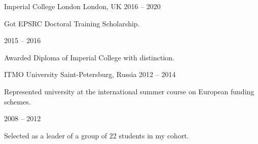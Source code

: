 

\begin{cventries}
            {Imperial College London} %
            {London, UK} %
            {2016 -- 2020} %
            {
                \begin{cvitems} %
                    \item {Got EPSRC Doctoral Training Scholarship.}
                \end{cvitems}
            }

            {} %
            {} %
            {2015 -- 2016} %
            {
                \begin{cvitems} %
                    \item {Awarded Diploma of Imperial College with distinction.}
                \end{cvitems}
            }

            {ITMO University} %
            {Saint-Petersburg, Russia} %
            {2012 -- 2014} %
            {
                \begin{cvitems} %
                    \item {Represented university at the international summer course on European funding schemes.}
                \end{cvitems}
            }

            {} %
            {} %
            {2008 -- 2012} %
            {
                \begin{cvitems} %
                    \item {Selected as a leader of a group of 22 students in my cohort.}
                \end{cvitems}
            }

\end{cventries}
